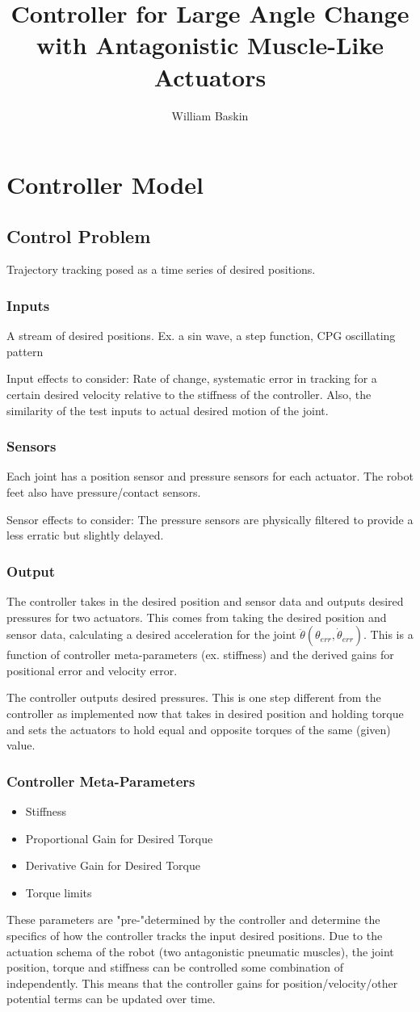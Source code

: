 \documentclass[12pt, letterpaper, oneside, notitlepage, onecolumn]{article}
\author{William Baskin}
\title{Controller for Large Angle Change with Antagonistic Muscle-Like Actuators}
\newcommand{\bbs}[1]{\section{#1}}
\newcommand{\bbss}[1]{\subsection{#1}}
\newcommand{\bbsss}[1]{\subsubsection{#1}}
\begin{document}
\maketitle

\bbs{Controller Model}

\bbss{Control Problem}

Trajectory tracking posed as a time series of desired positions.

\bbsss{Inputs}

A stream of desired positions. Ex. a sin wave, a step function, CPG oscillating
pattern

Input effects to consider: Rate of change, systematic error in tracking for a
certain desired velocity relative to the stiffness of the controller. Also, the
similarity of the test inputs to actual desired motion of the joint.

\bbsss{Sensors}

Each joint has a position sensor and pressure sensors for each actuator. The
robot feet also have pressure/contact sensors. 

Sensor effects to consider: The pressure sensors are
physically filtered to provide a less erratic but slightly delayed.

\bbsss{Output}

The controller takes in the desired position and sensor data and outputs desired
pressures for two actuators. This comes from taking the desired position and 
sensor data, calculating a desired acceleration for the joint 
$\ddot{\theta}(\theta_{err}, \dot{\theta}_{err})$. This is a function of 
controller meta-parameters (ex. stiffness) and the derived gains for 
positional error and velocity error.

The controller outputs desired pressures. This is one step different from the
controller as implemented now that takes in desired position and holding torque
and sets the actuators to hold equal and opposite torques of the same (given)
value.

\bbsss{Controller Meta-Parameters}

\begin{itemize}
\item Stiffness
\item Proportional Gain for Desired Torque
\item Derivative Gain for Desired Torque
\item Torque limits
\end{itemize}

These parameters are "pre-"determined by the controller and determine the
specifics of how the controller tracks the input desired positions. Due to the
actuation schema of the robot (two antagonistic pneumatic muscles), the joint
position, torque and stiffness can be controlled some combination of
independently. This means that the controller gains for position/velocity/other
potential terms can be updated over time.
\end{document}
